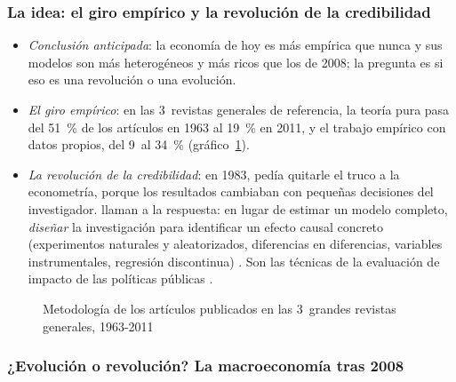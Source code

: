 \documentclass[11pt]{article}
\begin{document}
\subsubsection{La idea: el giro empírico y la revolución de la credibilidad}\label{sec:credibilidad}

\begin{itemize}
\item \emph{Conclusión anticipada}: la economía de hoy es más empírica que nunca y sus modelos son más heterogéneos y más ricos que los de 2008; la pregunta es si eso es una revolución o una evolución.
\item \emph{El giro empírico}: en las 3~revistas generales de referencia, la teoría pura pasa del 51~\% de los artículos en 1963 al 19~\% en 2011, y el trabajo empírico con datos propios, del 9~al 34~\%\nocite{Hamermesh2013Six} (gráfico~\ref{fig:metodologia-revistas}).
\item \emph{La revolución de la credibilidad}: en 1983,  \parencite*{Leamer1983} pedía quitarle el truco a la econometría, porque los resultados cambiaban con pequeñas decisiones del investigador. \textcite{AngristPischke2010Credibility} llaman  a la respuesta: en lugar de estimar un modelo completo, \emph{diseñar} la investigación para identificar un efecto causal concreto (experimentos naturales y aleatorizados, diferencias en diferencias, variables instrumentales, regresión discontinua) . Son las técnicas de la evaluación de impacto de las políticas públicas .
\end{itemize}

\begin{figure}[H]
\centering
\caption{Metodología de los artículos publicados en las 3~grandes revistas generales, 1963-2011}\label{fig:metodologia-revistas}
\end{figure}

\subsubsection{¿Evolución o revolución? La macroeconomía tras 2008}\label{sec:evolucion-revolucion}
\end{document}
